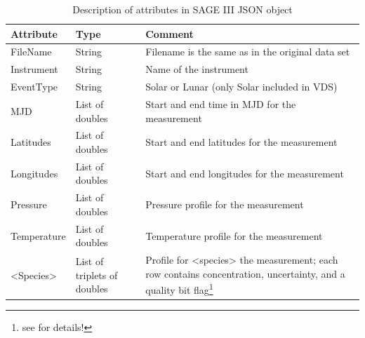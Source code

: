 \begin{table}
    \caption{Description of attributes in SAGE III JSON object}
    \label{tab:sage3data}
    \begin{tabular}{|l|p{1in}|p{3in}|}
\hline
Attribute & Type & Comment \\
\hline
FileName & String & Filename is the same as in the original data set \\
Instrument & String & Name of the instrument \\
EventType & String & Solar or Lunar (only Solar included in VDS) \\
MJD & List of doubles & Start and end time in MJD for the measurement \\
Latitudes & List of doubles & Start and end latitudes for the measurement \\
Longitudes & List of doubles & Start and end longitudes for the measurement \\
Pressure & List of doubles & Pressure profile for the measurement \\
Temperature & List of doubles & Temperature profile for the measurement \\
<Species> & List of triplets of doubles & Profile for <species> the measurement; each
row contains concentration, uncertainty, and a quality bit
flag\footnote{see \cite{SAGEIII_DPUG} for details!} \\
\hline
    \end{tabular}
\end{table}



